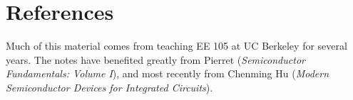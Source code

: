 \section{References}

Much of this material comes from teaching EE 105 at UC Berkeley for several years.  The notes have benefited greatly from Pierret (\emph{Semiconductor Fundamentals: Volume I}), and most recently from Chenming Hu (\emph{Modern Semiconductor Devices for Integrated Circuits}).  




